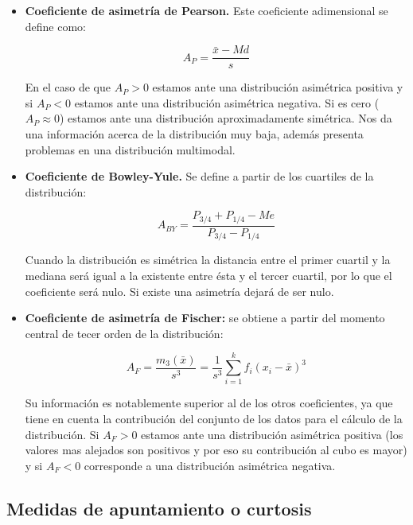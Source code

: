 \documentclass[12pt,a4paper]{book}
\begin{document}
\begin{itemize}
\item \textbf{Coeficiente de asimetría de Pearson.} Este coeficiente adimensional se define como:

\begin{equation}
A_P  = \dfrac{\bar{x}- Md}{s}
\end{equation}

En el caso de que $A_P > 0$ estamos ante una distribución asimétrica positiva y si $A_P < 0$ estamos ante una distribución asimétrica negativa. Si es cero ($A_P \approx 0$) estamos ante una distribución aproximadamente simétrica. Nos da una información acerca de la distribución muy baja, además presenta problemas en una distribución multimodal.

\item \textbf{Coeficiente de Bowley-Yule.} Se define a partir de los cuartiles de la distribución:

\begin{equation}
A_{BY} = \dfrac{P_{3/4} + P_{1/4} - Me}{P_{3/4} - P_{1/4}}
\end{equation}

Cuando la distribución es simétrica la distancia entre el primer cuartil y la mediana será igual a la existente entre ésta y el tercer cuartil, por lo que el coeficiente será nulo. Si existe una asimetría dejará de ser nulo.



\item \textbf{Coeficiente de asimetría de Fischer:} se obtiene a partir del momento central de tecer orden de la distribución:

\begin{equation}
A_F = \dfrac{m_3 (\bar{x})}{s^3} = \dfrac{1}{s^3} \sum_{i=1}^k f_i (x_i - \bar{x})^3
\end{equation}

Su información es notablemente superior al de los otros coeficientes, ya que tiene en cuenta la contribución del conjunto de los datos para el cálculo de la distribución. Si $A_F > 0$ estamos ante una distribución asimétrica positiva  (los valores mas alejados son positivos y por eso su contribución al cubo es mayor) y si $A_F < 0$ corresponde a una distribución asimétrica negativa.

\end{itemize}

\subsection{Medidas de apuntamiento o curtosis}
\end{document}
